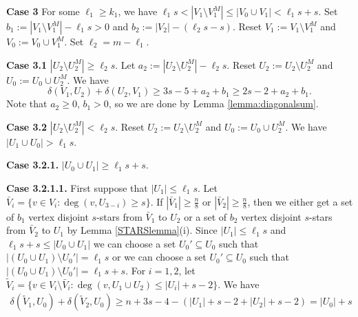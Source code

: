 \documentclass[oneside,12pt]{memoir}
\begin{document}
% 

\noindent
\textbf{Case 3}  For some $\ell_1\geq k_1$, we have $\ell_1s<|V_1\setminus V_1^M|\leq |V_0\cup V_1|<\ell_1s+s$.  Set $b_1:=|V_1\setminus V_1^M|-\ell_1s>0$ and $b_2:=|V_2|-(\ell_2s-s)$.  Reset $V_1:=V_1\setminus V_1^M$ and $V_0:=V_0\cup V_1^M$.  Set $\ell_2=m-\ell_1$.

\noindent
\textbf{Case 3.1} $|U_2\setminus U_2^M|\geq \ell_2s$.  Let $a_2:=|U_2\setminus U_2^M|-\ell_2s$.  Reset $U_2:=U_2\setminus U_2^M$ and $U_0:=U_0\cup U_2^M$.  We have 
\begin{equation}
\delta(V_1, U_2)+\delta(U_2, V_1)\geq 3s-5+a_2+b_1\geq 2s-2+a_2+b_1.
\end{equation}
Note that $a_2\geq 0$, $b_1>0$, so we are done by Lemma \ref{lemma:diagonalsum}.

\noindent
\textbf{Case 3.2} $|U_2\setminus U_2^M|<\ell_2s$.  Reset $U_2:=U_2\setminus U_2^M$ and $U_0:=U_0\cup U_2^M$.  We have $|U_1\cup U_0|>\ell_1s$.  

\textbf{Case 3.2.1.} $|U_0\cup U_1|\geq \ell_1s+s$.

\textbf{Case 3.2.1.1.} First suppose that $|U_1|\leq \ell_1s$.  Let $\bar{V}_i=\{v\in V_i:\deg(v, U_{3-i})\geq s\}$.  If $|\bar{V}_1|\geq \frac{n}{8}$ or $|\bar{V}_2|\geq \frac{n}{8}$, then we either get a set of $b_1$ vertex disjoint $s$-stars from $\bar{V}_1$ to $U_2$ or a set of $b_2$ vertex disjoint $s$-stars from $\bar{V}_2$ to $U_1$ by Lemma \ref{STARSlemma}(i).  Since $|U_1|\leq \ell_1s$ and $\ell_1s+s\leq |U_0\cup U_1|$ we can choose a set $U_0'\subseteq U_0$ such that $|(U_0\cup U_1)\setminus U_0'|=\ell_1s$ or we can choose a set $U_0'\subseteq U_0$ such that $|(U_0\cup U_1)\setminus U_0'|=\ell_1s+s$.  For $i=1,2$, let $\tilde{V}_i=\{v\in V_i\setminus \bar{V}_i:\deg(v, U_1\cup U_2)\leq |U_i|+s-2\}$.  We have 
\begin{align}
\delta(\tilde{V}_1, U_0)+\delta(\tilde{V}_2, U_0)\geq n+3s-4-(|U_1|+s-2+|U_2|+s-2)=|U_0|+s\label{gadget1}
\end{align}
\end{document}
